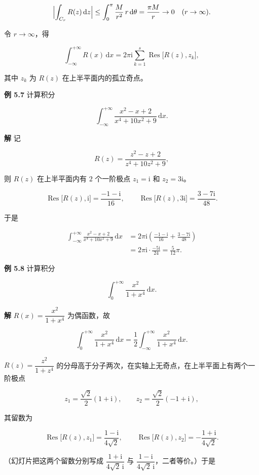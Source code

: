 \[
\Bigl|\int_{C_r}R(z)\,\mathrm dz\Bigr|
\le\int_{0}^{\pi}\frac{M}{r^{2}}\,r\,\mathrm d\theta
=\frac{\pi M}{r}\to0\quad(r\to\infty).
\]

令 \(r\to\infty\)，得

\[
\boxed{\displaystyle\int_{-\infty}^{+\infty}R(x)\,\mathrm dx
=2\pi\mathrm i\sum_{k=1}^{s}\operatorname{Res}\bigl[R(z),z_k\bigr]},
\]

其中 \(z_k\) 为 \(R(z)\) 在上半平面内的孤立奇点。

\textbf{例 5.7} 计算积分

\[
\int_{-\infty}^{+\infty}\frac{x^{2}-x+2}{x^{4}+10x^{2}+9}\,\mathrm dx .
\]

\textbf{解} 记

\[
R(z)=\frac{z^{2}-z+2}{z^{4}+10z^{2}+9},
\]

则 \(R(z)\) 在上半平面内有 \(2\) 个一阶极点 \(z_1=\mathrm i\) 和
\(z_2=3\mathrm i\)。

\[
\operatorname{Res}\bigl[R(z),\mathrm i\bigr]=\frac{-1-\mathrm i}{16},\qquad
\operatorname{Res}\bigl[R(z),3\mathrm i\bigr]=\frac{3-7\mathrm i}{48}.
\]

于是

\[
\begin{aligned}
\int_{-\infty}^{+\infty}\frac{x^{2}-x+2}{x^{4}+10x^{2}+9}\,\mathrm dx
&=2\pi\mathrm i\left(\frac{-1-\mathrm i}{16}+\frac{3-7\mathrm i}{48}\right)\\
&=2\pi\mathrm i\cdot\frac{-5\mathrm i}{24}
=\frac{5}{12}\pi .
\end{aligned}
\]

\textbf{例 5.8} 计算积分

\[
\int_{0}^{+\infty}\frac{x^{2}}{1+x^{4}}\,\mathrm dx .
\]

\textbf{解} \(R(x)=\dfrac{x^{2}}{1+x^{4}}\) 为偶函数，故

\[
\int_{0}^{+\infty}\frac{x^{2}}{1+x^{4}}\,\mathrm dx
=\frac12\int_{-\infty}^{+\infty}\frac{x^{2}}{1+x^{4}}\,\mathrm dx .
\]

\(R(z)=\dfrac{z^{2}}{1+z^{4}}\)
的分母高于分子两次，在实轴上无奇点，在上半平面上有两个一阶极点

\[
z_1=\frac{\sqrt2}{2}(1+\mathrm i),\qquad
z_2=\frac{\sqrt2}{2}(-1+\mathrm i),
\]

其留数为

\[
\operatorname{Res}\bigl[R(z),z_1\bigr]=\frac{1-\mathrm i}{4\sqrt2},\qquad
\operatorname{Res}\bigl[R(z),z_2\bigr]=-\frac{1+\mathrm i}{4\sqrt2}.
\]

（幻灯片把这两个留数分别写成 \(\dfrac{1+\mathrm i}{4\sqrt2\,\mathrm i}\)
与 \(\dfrac{1-\mathrm i}{4\sqrt2\,\mathrm i}\)，二者等价。）于是

